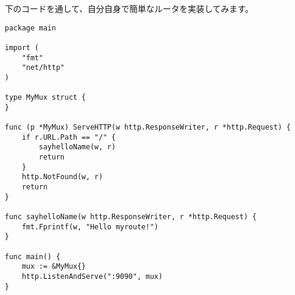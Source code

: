 下のコードを通して、自分自身で簡単なルータを実装してみます。

\begin{lstlisting}[numbers=none]
package main

import (
    "fmt"
    "net/http"
)

type MyMux struct {
}

func (p *MyMux) ServeHTTP(w http.ResponseWriter, r *http.Request) {
    if r.URL.Path == "/" {
        sayhelloName(w, r)
        return
    }
    http.NotFound(w, r)
    return
}

func sayhelloName(w http.ResponseWriter, r *http.Request) {
    fmt.Fprintf(w, "Hello myroute!")
}

func main() {
    mux := &MyMux{}
    http.ListenAndServe(":9090", mux)
}
\end{lstlisting}




